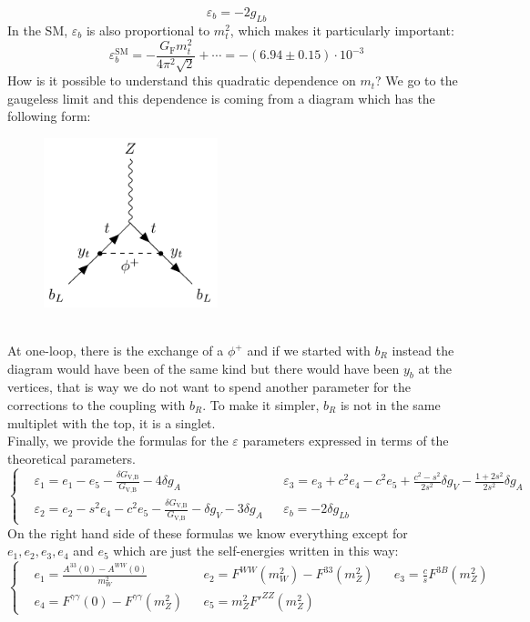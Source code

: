\documentclass[../main.tex]{subfiles}
\begin{document}
\[
\varepsilon_b=-2g_{Lb}
\]
In the SM, $\varepsilon_b$ is also proportional to $m_t^2$, which makes it particularly important:
\[
\varepsilon_b^{\text{SM}}=-\frac{G_{\text{F}}m_t^2}{4\pi^2\sqrt{2}}+\cdots=-(6.94\pm0.15)\cdot10^{-3}
\]
How is it possible to understand this quadratic dependence on $m_t$? We go to the gaugeless limit and this dependence is coming from a diagram which has the following form:
\begin{figure}[h]
    \centering
    \includegraphics[width=0.45\textwidth]{Images/bl.pdf}
    \caption*{}
\end{figure}\\
At one-loop, there is the exchange of a $\phi^+$ and if we started with $b_R$ instead the diagram would have been of the same kind but there would have been $y_b$ at the vertices, that is way we do not want to spend another parameter for the corrections to the coupling with $b_R$. To make it simpler, $b_R$ is not in the same multiplet with the top, it is a singlet.\\
Finally, we provide the formulas for the $\varepsilon$ parameters expressed in terms of the theoretical parameters.
\[
\left\{
\begin{aligned}
&\varepsilon_1=e_1-e_5-\frac{\delta G_{\text{V,B}}}{G_{\text{V,B}}}-4\delta g_A &&\varepsilon_3=e_3+c^2e_4-c^2e_5+\frac{c^2-s^2}{2s^2}\delta g_V-\frac{1+2s^2}{2s^2}\delta g_A\\
&\varepsilon_2=e_2-s^2e_4-c^2e_5-\frac{\delta G_{\text{V,B}}}{G_{\text{V,B}}}-\delta g_V-3\delta g_A &&\varepsilon_b=-2\delta g_{Lb}
\end{aligned}
\right.
\]
On the right hand side of these formulas we know everything except for $e_1, e_2, e_3, e_4$ and $e_5$ which are just the self-energies written in this way:
\[
\left\{
\begin{aligned}
&e_1=\frac{A^{33}(0)-A^{WW}(0)}{m_W^2} &&e_2=F^{WW}(m_W^2)-F^{33}(m_Z^2) &&e_3=\frac{c}{s}F^{3B}(m_Z^2)\\
&e_4=F^{\gamma\gamma}(0)-F^{\gamma\gamma}(m_Z^2) &&e_5=m_Z^2F'^{ZZ}(m_Z^2)
\end{aligned}
\right.
\]
\end{document}
